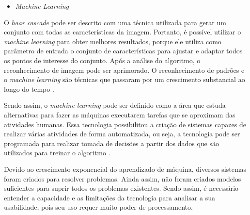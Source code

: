 \begin{itemize}
\raggedright \item \label{itm:machinelearning} \textit{Machine Learning}
\end{itemize}

O \textit{haar cascade} pode ser descrito com uma técnica utilizada para gerar um conjunto com todas as características da imagem.  Portanto, é possível utilizar o \textit{machine learning} para obter melhores resultados, porque ele utiliza como parâmetro de entrada o conjunto de características para ajustar e adaptar todos os pontos de interesse do conjunto.  Após a análise do algoritmo, o reconhecimento de imagem pode ser aprimorado. O reconhecimento de padrões e o \textit{machine learning} são técnicas que passaram por um crescimento substancial ao longo do tempo \cite{BISHOP2006}.
 
Sendo assim, o \textit{machine learning} pode ser definido como a área que estuda alternativas para fazer as máquinas executarem tarefas que se aproximam das atividades humanas. Essa tecnologia possibilitou a criação de sistemas capazes de realizar várias atividades de forma automatizada, ou seja, a tecnologia pode ser programada para realizar tomada de decisões a partir dos dados que são utilizados para treinar o algoritmo \cite{MONARD2003}.

Devido ao crescimento exponencial do aprendizado de máquina, diversos sistemas foram criados para resolver problemas. Ainda assim, não foram criados modelos suficientes para suprir todos os problemas existentes. Sendo assim, é necessário entender a capacidade e as limitações da tecnologia para analisar a sua usabilidade, pois seu uso requer muito poder de processamento.